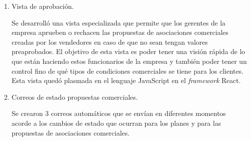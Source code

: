 \begin{enumerate}
    \item Vista de aprobación.
    
    Se desarrolló una vista especializada que permite que los gerentes de la empresa aprueben o rechacen las propuestas de asociaciones comerciales creadas por los vendedores en caso de que no sean tengan valores preaprobados. El objetivo de esta vista es poder tener una visión rápida de lo que están haciendo estos funcionarios de la empresa y también poder tener un control fino de qué tipos de condiciones comerciales se tiene para los clientes. Esta vista quedó plasmada en el lenguaje JavaScript en el \textit{framework} React.
    
    \item Correos de estado propuestas comerciales.
    
    Se crearon 3 correos automáticos que se envían en diferentes momentos acorde a los cambios de estado que ocurran para los planes y para las propuestas de asociaciones comerciales.

  \end{enumerate}